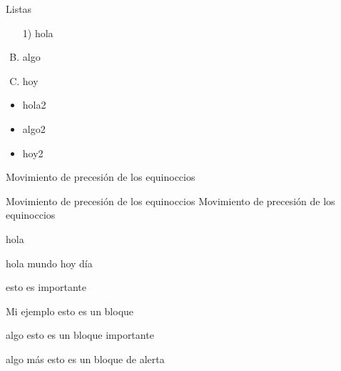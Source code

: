 \documentclass[utf8,spanish,
xcolor={x11names, table},14pt,handout]{beamer} %
\begin{document}
\begin{frame}{Listas}
\begin{enumerate}[A)]%
	\item[1)] hola
	\item algo
	\item hoy
\end{enumerate}

\begin{itemize}
	\item hola2
	\item algo2
	\item hoy2
\end{itemize}

\begin{description}[MMMMMM] %
	\item [casa] Movimiento de precesión de los equinoccios
	
	\item [mesa] Movimiento de precesión de los equinoccios Movimiento de precesión de los equinoccios
	
	\item [silla] hola
\end{description}
\end{frame}

\begin{frame}
	hola mundo \alert{hoy} día\newline%
	
	\begin{alertenv}
		esto es importante
	\end{alertenv}
\end{frame}

\begin{frame}
\justifying%
\lipsum[4]
\end{frame}

\begin{frame}
	\begin{block}{Mi ejemplo}
		esto es un bloque
	\end{block}

	\begin{exampleblock}{algo}
		esto es un bloque importante%
	\end{exampleblock}

	\begin{alertblock}{algo más}
	esto es un bloque de alerta
	\end{alertblock}
\end{frame}
\end{document}
